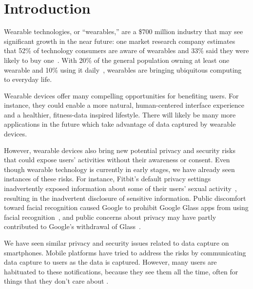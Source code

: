 
\section{Introduction}

Wearable technologies, or ``wearables,'' are a \$700 million industry \cite{cmo} that may see significant growth in the near future: one market research company estimates that 52\% of technology consumers are aware of wearables and 33\% said they were likely to buy one~\cite{NPD}. With 20\% of the general population owning at least one wearable and 10\% using it daily~\cite{WearableStatNews}, wearables are bringing ubiquitous computing to everyday life.


Wearable devices offer many compelling opportunities for benefiting users.  For instance, they could enable a more natural, human-centered interface experience and a healthier, fitness-data inspired lifestyle. There will likely be many more applications in the future which take advantage of data captured by wearable devices.

However, wearable devices also bring new potential privacy and security risks that could expose users' activities without their awareness or consent. Even though wearable technology is currently in early stages, we have already seen instances of these risks. For instance, Fitbit's default privacy settings inadvertently exposed information about some of their users' sexual activity~\cite{Fitbit}, resulting in the inadvertent disclosure of sensitive information. Public discomfort toward facial recognition caused Google to prohibit Google Glass apps from using facial recognition~\cite{GlassDetection}, and public concerns about privacy may have partly contributed to Google's withdrawal of Glass~\cite{14_dvorak_2014,1_russell_2014, 15_mashable_2014, 16_gross_2014}.

We have seen similar privacy \cite{kelley2013privacy, sadeh2009understanding, shklovski2014leakiness} and security issues \cite{enck2011study, felt2011survey} related to data capture on smartphones. Mobile platforms have tried to address the risks by communicating data capture to users as the data is captured. However, many users are habituated to these notifications, because they see them all the time, often for things that they don't care about \cite{felt2012android}.

